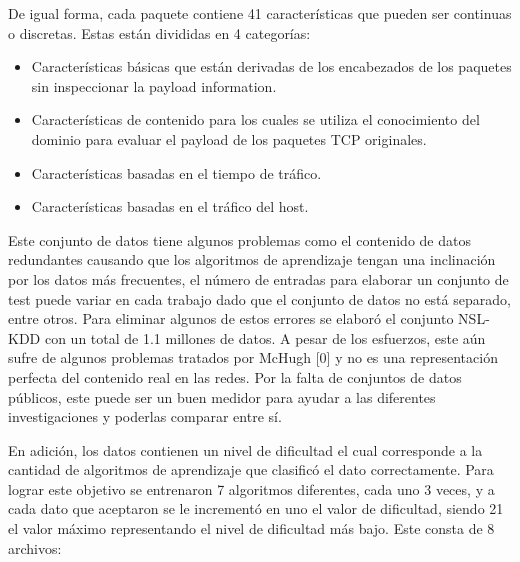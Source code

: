 De igual forma, cada paquete contiene 41 características que pueden ser continuas o discretas. Estas están divididas en 4 categorías:

\begin{itemize}
    \item Características básicas que están derivadas de los encabezados de los paquetes sin inspeccionar la payload information.
    \item Características de contenido para los cuales se utiliza el conocimiento del dominio para evaluar el payload de los paquetes TCP originales.
    \item Características basadas en el tiempo de tráfico.
    \item Características basadas en el tráfico del host.
\end{itemize}

Este conjunto de datos tiene algunos problemas como el contenido de datos redundantes causando que los algoritmos de aprendizaje tengan una inclinación por los datos más frecuentes, el número de entradas para elaborar un conjunto de test puede variar en cada trabajo dado que el conjunto de datos no está separado, entre otros. Para eliminar algunos de estos errores se elaboró el conjunto NSL-KDD con un total de 1.1 millones de datos. A pesar de los esfuerzos, este aún sufre de algunos problemas tratados por McHugh [0] y no es una representación perfecta del contenido real en las redes. Por la falta de conjuntos de datos públicos, este puede ser un buen medidor para ayudar a las diferentes investigaciones y poderlas comparar entre sí. 

En adición, los datos contienen un nivel de dificultad el cual corresponde a la cantidad de algoritmos de aprendizaje que clasificó el dato correctamente. Para lograr este objetivo se entrenaron 7 algoritmos diferentes, cada uno 3 veces, y a cada dato que aceptaron se le incrementó en uno el valor de dificultad, siendo 21 el valor máximo representando el nivel de dificultad más bajo. Este consta de 8 archivos:

